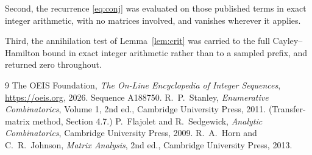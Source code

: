 \documentclass[11pt,a4paper]{article}
\theoremstyle{plain}
\theoremstyle{definition}
\begin{document}
Second, the recurrence \eqref{eq:conj} was evaluated on those published terms in exact
integer arithmetic, with no matrices involved, and vanishes wherever it applies.

Third, the annihilation test of Lemma~\ref{lem:crit} was carried to the full
Cayley--Hamilton bound in exact integer arithmetic rather than to a sampled prefix, and
returned zero throughout.

\begin{thebibliography}{9}
 The OEIS Foundation, \emph{The On-Line Encyclopedia of Integer
Sequences}, \url{https://oeis.org}, 2026. Sequence A188750.
 R.~P.~Stanley, \emph{Enumerative Combinatorics}, Volume 1, 2nd ed.,
Cambridge University Press, 2011. (Transfer-matrix method, Section 4.7.)
 P.~Flajolet and R.~Sedgewick, \emph{Analytic Combinatorics}, Cambridge
University Press, 2009.
 R.~A.~Horn and C.~R.~Johnson, \emph{Matrix Analysis}, 2nd ed., Cambridge
University Press, 2013.
\end{thebibliography}
\end{document}

